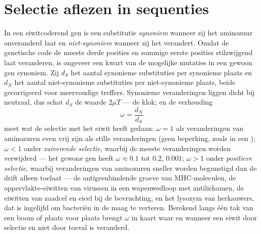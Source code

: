 \section{Selectie aflezen in sequenties}

\begin{definition}[dN/dS]\label{def:b3:molecular-evolution:dnds}
In een eiwitcoderend gen is een substitutie \emph{synoniem} wanneer zij
het aminozuur onveranderd laat en \emph{niet-synoniem} wanneer zij het
verandert. Omdat de genetische code de meeste derde posities en sommige
eerste posities stilzwijgend laat veranderen, is ongeveer een kwart van
de mogelijke mutaties in een gewoon gen synoniem. Zij $d_{S}$ het
aantal synonieme substituties per synonieme plaats en $d_{N}$ het
aantal niet-synonieme substituties per niet-synonieme plaats, beide
gecorrigeerd voor meervoudige treffers. Synonieme veranderingen liggen
dicht bij neutraal, dus schat $d_{S}$ de waarde $2\mu T$ --- de klok;
en de verhouding
\[
\omega = \frac{d_{N}}{d_{S}}
\]
meet wat de selectie met het eiwit heeft gedaan: $\omega = 1$ als
veranderingen van aminozuren even vrij zijn als stille veranderingen
(geen beperking, zoals in een ); $\omega < 1$ onder
\emph{zuiverende selectie}, waarbij de meeste veranderingen worden
verwijderd --- het gewone gen heeft $\omega \approx 0.1$ tot $0.2$,
 $0.001$; $\omega > 1$ onder \emph{positieve selectie}, waarbij
veranderingen van aminozuren sneller worden begunstigd dan de drift
alleen toelaat --- de antigeenbindende groeve van MHC-moleculen, de
oppervlakte-eiwitten van virussen in een wapenwedloop met antilichamen,
de eiwitten van zaadcel en eicel bij de bevruchting, en het lysozym van
herkauwers, dat is ingelijfd om bacteriën in de maag te verteren.
Berekend langs één tak van een boom of plaats voor plaats brengt
$\omega$ in kaart waar en wanneer een eiwit door selectie en niet door
toeval is veranderd.
\end{definition}

